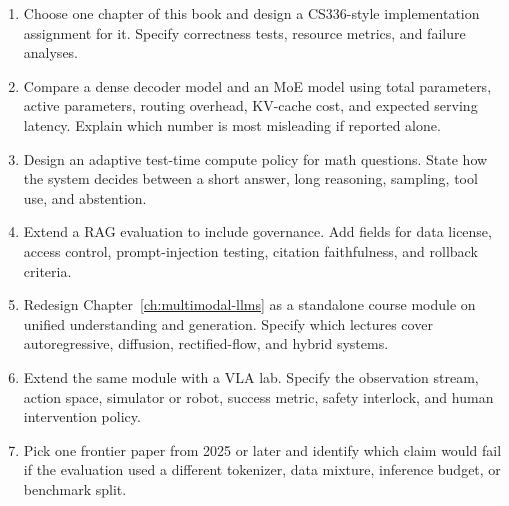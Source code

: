 \begin{enumerate}
\item Choose one chapter of this book and design a CS336-style implementation assignment for it. Specify correctness tests, resource metrics, and failure analyses.
\item Compare a dense decoder model and an MoE model using total parameters, active parameters, routing overhead, KV-cache cost, and expected serving latency. Explain which number is most misleading if reported alone.
\item Design an adaptive test-time compute policy for math questions. State how the system decides between a short answer, long reasoning, sampling, tool use, and abstention.
\item Extend a RAG evaluation to include governance. Add fields for data license, access control, prompt-injection testing, citation faithfulness, and rollback criteria.
\item Redesign Chapter~\ref{ch:multimodal-llms} as a standalone course module on unified understanding and generation. Specify which lectures cover autoregressive, diffusion, rectified-flow, and hybrid systems.
\item Extend the same module with a VLA lab. Specify the observation stream, action space, simulator or robot, success metric, safety interlock, and human intervention policy.
\item Pick one frontier paper from 2025 or later and identify which claim would fail if the evaluation used a different tokenizer, data mixture, inference budget, or benchmark split.
\end{enumerate}
